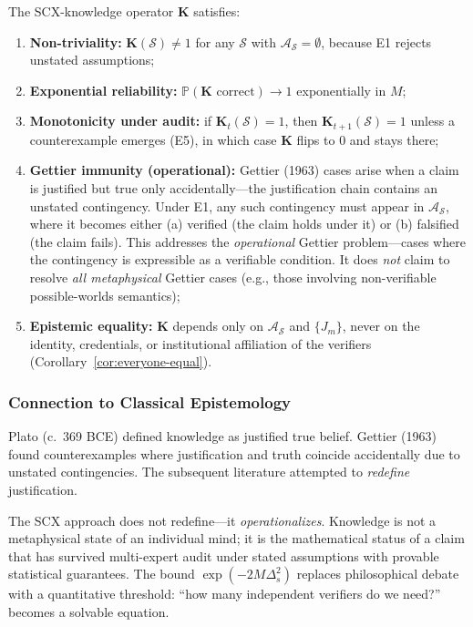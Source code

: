 \begin{corollary}
\label{cor:K-properties}
The SCX-knowledge operator $\mathbf{K}$ satisfies:
\begin{enumerate}[label=(\roman*)]
  \item \textbf{Non-triviality:} $\mathbf{K}(\mathcal{S}) \neq 1$ for any
    $\mathcal{S}$ with $\mathcal{A}_{\mathcal{S}}=\emptyset$, because
    E1 rejects unstated assumptions;
  \item \textbf{Exponential reliability:}
    $\mathbb{P}(\mathbf{K} \text{ correct}) \to 1$ exponentially in $M$;
  \item \textbf{Monotonicity under audit:} if $\mathbf{K}_t(\mathcal{S})=1$,
    then $\mathbf{K}_{t+1}(\mathcal{S})=1$ unless a counterexample emerges
    (E5), in which case $\mathbf{K}$ flips to $0$ and stays there;
  \item \textbf{Gettier immunity (operational):} Gettier (1963) cases arise when a claim
    is justified but true only accidentally---the justification chain
    contains an unstated contingency. Under E1, any such contingency must
    appear in $\mathcal{A}_{\mathcal{S}}$, where it becomes either (a)
    verified (the claim holds under it) or (b) falsified (the claim
    fails). This addresses the \emph{operational} Gettier problem---cases
    where the contingency is expressible as a verifiable condition. It does
    \emph{not} claim to resolve \emph{all metaphysical} Gettier cases
    (e.g., those involving non-verifiable possible-worlds semantics);
  \item \textbf{Epistemic equality:} $\mathbf{K}$ depends only
    on $\mathcal{A}_{\mathcal{S}}$ and $\{J_m\}$, never on the identity,
    credentials, or institutional affiliation of the verifiers
    (Corollary~\ref{cor:everyone-equal}).
\end{enumerate}
\end{corollary}

\subsubsection{Connection to Classical Epistemology}
\label{sec:epistemic-classical}

\begin{remark}
Plato (c.\ 369 BCE) defined knowledge as justified true belief.
Gettier (1963) found counterexamples where justification and truth
coincide accidentally due to unstated contingencies. The subsequent
literature attempted to \textit{redefine} justification.

The SCX approach does not redefine---it \textit{operationalizes}.
Knowledge is not a metaphysical state of an individual mind; it is
the mathematical status of a claim that has survived multi-expert
audit under stated assumptions with provable statistical guarantees.
The bound $\exp(-2M\Delta_s^2)$ replaces philosophical debate with
a quantitative threshold: ``how many independent verifiers do we
need?'' becomes a solvable equation.
\end{remark}

